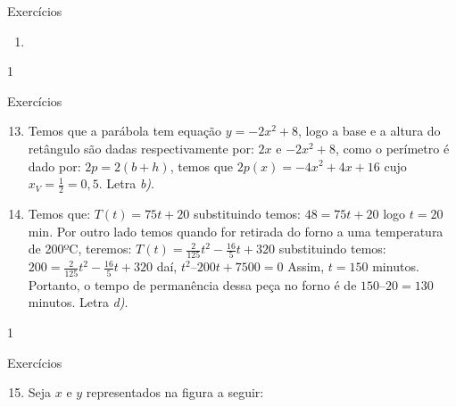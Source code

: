 {\begin{answer}{Exercícios}
{\begin{enumerate}
\item {}
{
}
\end{enumerate}
}{1}
\end{answer}
\begin{answer}{Exercícios}
{\exerciselist
\begin{enumerate}\setcounter{enumi}{12}
\item Temos que a parábola tem equação \(y=-2x^2+8\), logo a base e a altura do retângulo são dadas respectivamente por: \(2x\) e \(-2x^2+8\), como o perímetro é dado por: \(2p=2(b+h)\), temos que \(2p(x)=-4x^2+4x+16\) cujo \(x_V=\frac{1}{2}=0,5\). Letra \textit{b)}.

\item Temos que: \(T(t) = 75t+20\) substituindo temos: \(48 = 75t+20\) logo \(t = 20\) min. Por outro lado temos quando for  retirada do forno  a uma temperatura  de 200ºC,  teremos:
\(T(t) = \frac{2}{125}t^2− \frac{16}{5}t+320\) substituindo temos: \(200 = \frac{2}{125}t^2− \frac{16}{5}t+320\) daí, \(t^2 – 200t + 7 500 = 0\)
Assim, \(t = 150\) minutos. Portanto, o tempo de permanência dessa peça no forno é de \(150 – 20 = 130\) minutos. Letra \textit{d)}.
\end{enumerate}
}{1}
\end{answer}
\clearmargin
\begin{answer}{Exercícios}
{\exerciselist
\begin{enumerate}\setcounter{enumi}{14}
\item Seja \(x\) e \(y\) representados na figura a seguir:

\begin{figure}[H]
\centering


\end{figure}
\end{enumerate}}
\end{answer}}
